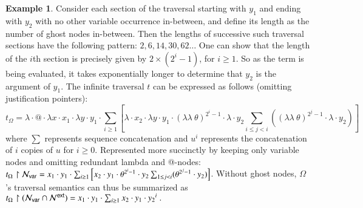 \documentclass{elsarticle}
\theoremstyle{plain}
\theoremstyle{definition}
\newtheorem{example}{Example}[section]
\theoremstyle{remark}
\newcommand\Nodes{\mathcal{N}}%
\newcommand\NodesVar{\Nodes_{\sf var}}%
\newcommand{\ghostlmd}{{\lambda\!\!\lambda}}
\newcommand{\ghostvar}{\theta}
\newcommand{\ExtNodes}{\Nodes^{\sf ext}}
\begin{document}
\begin{example}
    Consider each section of the traversal starting with $y_1$ and ending with $y_2$ with no other variable occurrence in-between, and define its length as the number of ghost nodes in-between. Then the lengths of successive such traversal sections have the following pattern: $2,6,14,30,62\ldots$
    One can show that the length of the $i$th section is precisely given by $2\times(2^i-1)$, for $i\geq1$.
    So as the term is being evaluated, it takes exponentially longer to determine that $y_2$ is the argument of $y_1$.
    The infinite traversal $t$ can be expressed as follows (omitting justification pointers):
    \begin{equation*}
    t_\Omega = \lambda \cdot @ \cdot \lambda x \cdot  x_1 \cdot \lambda y \cdot y_1
    \cdot  \sum_{i\geq 1}
        \left[
            \lambda \cdot x_2 \cdot \lambda y \cdot y_1 \cdot
             {(\ghostlmd\ \ghostvar)}^{2^i -1}\cdot \lambda \cdot y_2
                 \sum_{i\leq j<i}
                    \left(
                        {(\ghostlmd\ \ghostvar)}^{2^j -1}
                        \cdot
                        \lambda \cdot y_2
                    \right)
        \right]
    \end{equation*}
    where $\sum$ represents sequence concatenation and $u^i$ represents the concatenation of $i$ copies of $u$ for $i\geq 0$.
    Represented more succinctly by keeping only variable nodes and omitting redundant lambda and @-nodes:
    $t_\Omega \filter \NodesVar =  x_1 \cdot y_1
        \cdot  \sum_{i\geq 1}
            \left[
                x_2 \cdot y_1 \cdot
                 \ghostvar^{2^i -1}\cdot y_2
                     \sum_{1\leq j <i} (\ghostvar^{2^j -1} \cdot y_2)
            \right]
    $.
    Without ghost nodes, $\Omega$'s traversal semantics can thus be summarized as
    $
        t_\Omega \filter (\NodesVar\inter\ExtNodes) =  x_1 \cdot y_1
        \cdot  \sum_{i\geq 1} x_2 \cdot y_1 \cdot {y_2}^i \ .
    $
\end{example}
\end{document}
